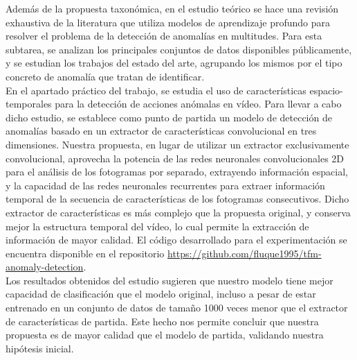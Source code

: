 Además de la propuesta taxonómica, en el estudio teórico se hace una
revisión exhaustiva de la literatura que utiliza modelos de
aprendizaje profundo para resolver el problema de la detección de
anomalías en multitudes. Para esta subtarea, se analizan los
principales conjuntos de datos disponibles públicamente, y se estudian
los trabajos del estado del arte, agrupando los mismos por el tipo
concreto de anomalía que tratan de identificar.\\

En el apartado práctico del trabajo, se estudia el uso de
características espacio-temporales para la detección de acciones
anómalas en vídeo. Para llevar a cabo dicho estudio, se establece como
punto de partida un modelo de detección de anomalías basado en un
extractor de características convolucional en tres
dimensiones. Nuestra propuesta, en lugar de utilizar un extractor
exclusivamente convolucional, aprovecha la potencia de las redes
neuronales convolucionales 2D para el análisis de los fotogramas por
separado, extrayendo información espacial, y la capacidad de las redes
neuronales recurrentes para extraer información temporal de la
secuencia de características de los fotogramas consecutivos. Dicho
extractor de características es más complejo que la propuesta
original, y conserva mejor la estructura temporal del vídeo, lo cual
permite la extracción de información de mayor calidad. El código
desarrollado para el experimentación se encuentra disponible en el
repositorio \url{https://github.com/fluque1995/tfm-anomaly-detection}.\\

Los resultados obtenidos del estudio sugieren que nuestro modelo tiene
mejor capacidad de clasificación que el modelo original, incluso a
pesar de estar entrenado en un conjunto de datos de tamaño 1000 veces
menor que el extractor de características de partida. Este hecho
nos permite concluir que nuestra propuesta es de mayor calidad que el
modelo de partida, validando nuestra hipótesis inicial.

\newpage